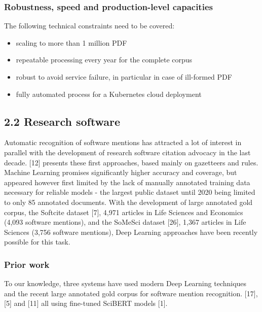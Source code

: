 \documentclass[
]{article}
\providecommand{\tightlist}{%
  \setlength{\itemsep}{0pt}\setlength{\parskip}{0pt}}
\begin{document}
\hypertarget{robustness-speed-and-production-level-capacities}{%
\subsubsection{Robustness, speed and production-level
capacities}\label{robustness-speed-and-production-level-capacities}}

The following technical constraints need to be covered:

\begin{itemize}
\tightlist
\item
  scaling to more than 1 million PDF
\item
  repeatable processing every year for the complete corpus
\item
  robust to avoid service failure, in particular in case of ill-formed
  PDF
\item
  fully automated process for a Kubernetes cloud deployment
\end{itemize}

\hypertarget{research-software}{%
\subsection{2.2 Research software}\label{research-software}}

Automatic recognition of software mentions has attracted a lot of
interest in parallel with the development of research software citation
advocacy in the last decade. {[}12{]} presents these first approaches,
based mainly on gazetteers and rules. Machine Learning promises
significantly higher accuracy and coverage, but appeared however first
limited by the lack of manually annotated training data necessary for
reliable models - the largest public dataset until 2020 being limited to
only 85 annotated documents. With the development of large annotated
gold corpus, the Softcite dataset {[}7{]}, 4,971 articles in Life
Sciences and Economics (4,093 software mentions), and the SoMeSci
dataset {[}26{]}, 1,367 articles in Life Sciences (3,756 software
mentions), Deep Learning approaches have been recently possible for this
task.

\hypertarget{prior-work}{%
\subsubsection{Prior work}\label{prior-work}}

To our knowledge, three systems have used modern Deep Learning
techniques and the recent large annotated gold corpus for software
mention recognition. {[}17{]}, {[}5{]} and {[}11{]} all using fine-tuned
SciBERT models {[}1{]}.
\end{document}
